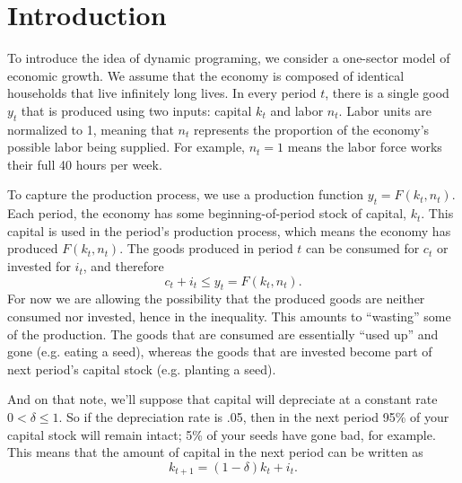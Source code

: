 \documentclass[12pt]{article}
\theoremstyle{definition}
\begin{document}
\maketitle
\onehalfspace




\section{Introduction}

To introduce the idea of dynamic programing, we consider a one-sector model of economic growth. We assume that the economy is composed of identical households that live infinitely long lives. In every period $t$, there is a single good $y_t$ that is produced using two inputs: capital $k_t$ and labor $n_t$. Labor units are normalized to 1, meaning that $n_t$ represents the proportion of the economy's possible labor being supplied. For example, $n_t=1$ means the labor force works their full 40 hours per week.

To capture the production process, we use a production function $y_t=F(k_t, n_t)$. Each period, the economy has some beginning-of-period stock of capital, $k_t$. This capital is used in the period's production process, which means the economy has produced $F(k_t, n_t)$. The goods produced in period $t$ can be consumed for $c_t$ or invested for $i_t$, and therefore
	\[c_t + i_t \leq y_t = F(k_t, n_t).	\]
For now we are allowing the possibility that the produced goods are neither consumed nor invested, hence in the inequality. This amounts to ``wasting''  some of the production. The goods that are consumed are essentially ``used up'' and gone (e.g. eating a seed), whereas the goods that are invested become part of next period's capital stock (e.g. planting a seed). 

And on that note, we'll suppose that capital will depreciate at a constant rate $0 < \delta \leq 1$. So if the depreciation rate is .05, then in the next period 95\% of your capital stock will remain intact; 5\% of your seeds have gone bad, for example. This means that the amount of capital in the next period can be written as
	\[ k_{t+1} = (1 - \delta)k_t + i_t.\]
\end{document}

